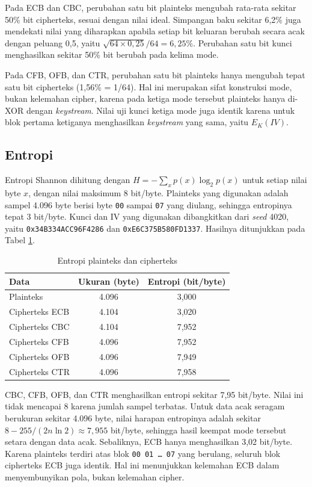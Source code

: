 Pada ECB dan CBC, perubahan satu bit plainteks mengubah rata-rata sekitar 50\% bit cipherteks, sesuai dengan nilai ideal. Simpangan baku sekitar 6,2\% juga mendekati nilai yang diharapkan apabila setiap bit keluaran berubah secara acak dengan peluang 0,5, yaitu $\sqrt{64 \times 0{,}25}/64 = 6{,}25\%$. Perubahan satu bit kunci menghasilkan sekitar 50\% bit berubah pada kelima mode.

Pada CFB, OFB, dan CTR, perubahan satu bit plainteks hanya mengubah tepat satu bit cipherteks (1,56\% = 1/64). Hal ini merupakan sifat konstruksi mode, bukan kelemahan cipher, karena pada ketiga mode tersebut plainteks hanya di-XOR dengan \textit{keystream}. Nilai uji kunci ketiga mode juga identik karena untuk blok pertama ketiganya menghasilkan \textit{keystream} yang sama, yaitu $E_K(IV)$.

\subsection{Entropi}
Entropi Shannon dihitung dengan $H = -\sum_{x} p(x) \log_2 p(x)$ untuk setiap nilai byte $x$, dengan nilai maksimum 8 bit/byte. Plainteks yang digunakan adalah sampel 4.096 byte berisi byte \texttt{00} sampai \texttt{07} yang diulang, sehingga entropinya tepat 3 bit/byte. Kunci dan IV yang digunakan dibangkitkan dari \textit{seed} 4020, yaitu \texttt{0x34B334ACC96F4286} dan \texttt{0xE6C375B580FD1337}. Hasilnya ditunjukkan pada Tabel \ref{tab:entropi}.

\begin{table}[H]
    \centering
    \small
    \caption{Entropi plainteks dan cipherteks}
    \label{tab:entropi}
    \begin{tabular}{@{}lcc@{}}
        \toprule
        \textbf{Data} & \textbf{Ukuran (byte)} & \textbf{Entropi (bit/byte)} \\
        \midrule
        Plainteks & 4.096 & 3,000 \\
        Cipherteks ECB & 4.104 & 3,020 \\
        Cipherteks CBC & 4.104 & 7,952 \\
        Cipherteks CFB & 4.096 & 7,952 \\
        Cipherteks OFB & 4.096 & 7,949 \\
        Cipherteks CTR & 4.096 & 7,958 \\
        \bottomrule
    \end{tabular}
\end{table}

CBC, CFB, OFB, dan CTR menghasilkan entropi sekitar 7,95 bit/byte. Nilai ini tidak mencapai 8 karena jumlah sampel terbatas. Untuk data acak seragam berukuran sekitar 4.096 byte, nilai harapan entropinya adalah sekitar $8 - 255/(2n \ln 2) \approx 7{,}955$ bit/byte, sehingga hasil keempat mode tersebut setara dengan data acak. Sebaliknya, ECB hanya menghasilkan 3,02 bit/byte. Karena plainteks terdiri atas blok \texttt{00 01 \ldots{} 07} yang berulang, seluruh blok cipherteks ECB juga identik. Hal ini menunjukkan kelemahan ECB dalam menyembunyikan pola, bukan kelemahan cipher.

